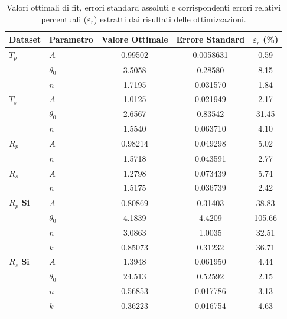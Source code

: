 \documentclass[a4paper,12pt]{article}
\begin{document}
\begin{table}[htbp]
\centering
\small
\caption{Valori ottimali di fit, errori standard assoluti e corrispondenti errori relativi percentuali ($\varepsilon_r$) estratti dai risultati delle ottimizzazioni.}
\label{tab:dati_fit_esatti}
\smallskip
\begin{tabular}{ll S[table-format=1.4e-1] S[table-format=1.4e-1] S[table-format=3.2]}
\toprule
\textbf{Dataset} & \textbf{Parametro} & {\textbf{Valore Ottimale}} & {\textbf{Errore Standard}} & {\textbf{$\varepsilon_r$ (\%)}} \\
\midrule
\textbf{$T_p$}  
    & $A$          & 0.99502  & 0.0058631 & 0.59 \\
    & $\theta_0$  & 3.5058   & 0.28580   & 8.15 \\
    & $n$          & 1.7195   & 0.031570  & 1.84 \\
\midrule
\textbf{$T_s$}  
    & $A$          & 1.0125   & 0.021949  & 2.17 \\
    & $\theta_0$  & 2.6567   & 0.83542   & 31.45 \\
    & $n$          & 1.5540   & 0.063710  & 4.10 \\
\midrule
\textbf{$R_p$}  
    & $A$          & 0.98214  & 0.049298  & 5.02 \\
    & $n$          & 1.5718   & 0.043591  & 2.77 \\
\midrule
\textbf{$R_s$}  
    & $A$          & 1.2798   & 0.073439  & 5.74 \\
    & $n$          & 1.5175   & 0.036739  & 2.42 \\
\midrule
\textbf{$R_p$ Si}  
    & $A$          & 0.80869  & 0.31403   & 38.83 \\
    & $\theta_0$  & 4.1839   & 4.4209    & 105.66 \\
    & $n$          & 3.0863   & 1.0035    & 32.51 \\
    & $k$          & 0.85073  & 0.31232   & 36.71 \\
\midrule
\textbf{$R_s$ Si}  
    & $A$          & 1.3948   & 0.061950  & 4.44 \\
    & $\theta_0$  & 24.513   & 0.52592   & 2.15 \\
    & $n$          & 0.56853  & 0.017786  & 3.13 \\
    & $k$          & 0.36223  & 0.016754  & 4.63 \\
\bottomrule
\end{tabular}
\end{table}
\end{document}
